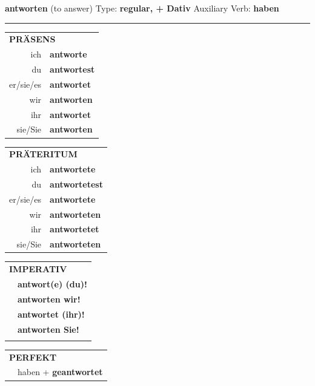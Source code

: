 \documentclass[10pt,a4paper]{revtex4-2}
\begin{document}
\begin{verbbox-dat}
    {\Large \bf antworten} (to answer) \hfill Type: \textbf{regular, + Dativ} \hfill Auxiliary Verb: \textbf{haben} 
    
     \vspace{5pt}

    \hrule
    
    \vspace{5pt}

  \begin{tabular}{rl}
     \multicolumn{2}{l}{\textbf{PRÄSENS} }\\
    ich & \textbf{antworte}\\
    du & \textbf{antwortest}\\
    er/sie/es & \textbf{antwortet}\\
    wir & \textbf{antworten}\\
    ihr & \textbf{antwortet}\\
    sie/Sie & \textbf{antworten}\\
  \end{tabular}
  \hfill
     \begin{tabular}{rl}
    \multicolumn{2}{l}{\textbf{PRÄTERITUM} }\\
    ich & \textbf{antwortete}\\
    du & \textbf{antwortetest}\\
    er/sie/es & \textbf{antwortete}\\
    wir & \textbf{antworteten}\\
    ihr & \textbf{antwortetet}\\
    sie/Sie & \textbf{antworteten}\\
  \end{tabular}
  \hfill
  \begin{tabular}{rl}
     \multicolumn{2}{l}{\textbf{IMPERATIV} }\\
   & \textbf{antwort(e) (du)!}\\
   & \textbf{antworten wir!}\\
   & \textbf{antwortet (ihr)!}\\
   & \textbf{antworten Sie!}\\
   & \vspace{10pt}
  \end{tabular}

    \vspace{10pt}

 \begin{tabular}{rl}
     \multicolumn{2}{l}{\textbf{PERFEKT}}\\
  &  haben + \textbf{geantwortet}\\
  \end{tabular}
\hfill
   \begin{tabular}{rl}
   

\end{tabular}
\end{verbbox-dat}
\end{document}
